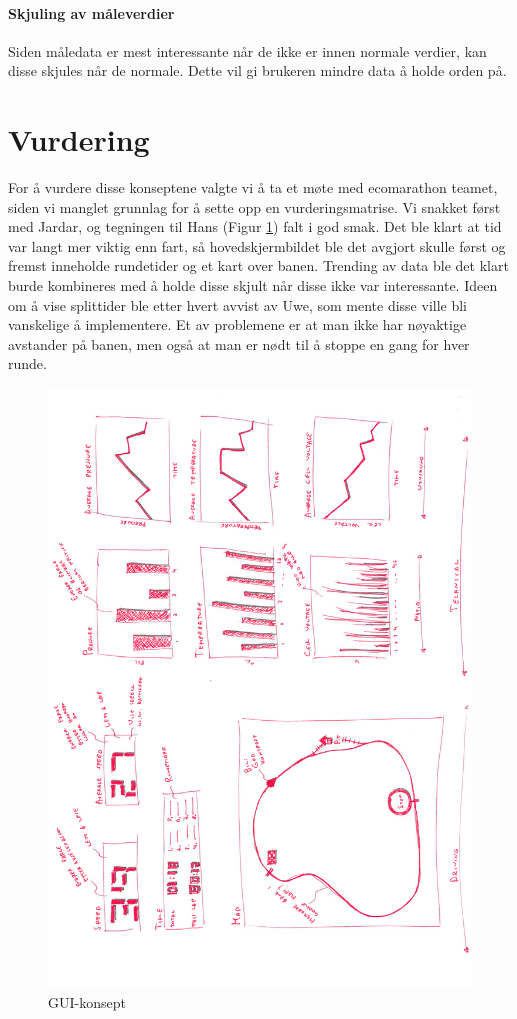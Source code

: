 \paragraph{Skjuling av måleverdier}
Siden måledata er mest interessante når de ikke er innen normale verdier, kan disse skjules når de normale.
Dette vil gi brukeren mindre data å holde orden på.

\section{Vurdering}
For å vurdere disse konseptene valgte vi å ta et møte med ecomarathon teamet, siden vi manglet grunnlag for å sette opp en vurderingsmatrise. 
Vi snakket først med Jardar, og tegningen til Hans (Figur \ref{gui-concept}) falt i god smak. 
Det ble klart at tid var langt mer viktig enn fart, så hovedskjermbildet ble det avgjort skulle først og fremst inneholde rundetider og et kart over banen. 
Trending av data ble det klart burde kombineres med å holde disse skjult når disse ikke var interessante.
Ideen om å vise splittider ble etter hvert avvist av Uwe, som mente disse ville bli vanskelige å implementere. 
Et av problemene er at man ikke har nøyaktige avstander på banen, men også at man er nødt til å stoppe en gang for hver runde.

\begin{figure}[H]
\caption{GUI-konsept} 
\label{gui-concept}
\includegraphics[width=\textwidth]{images/gui_concept_hans.pdf}
\end{figure}
